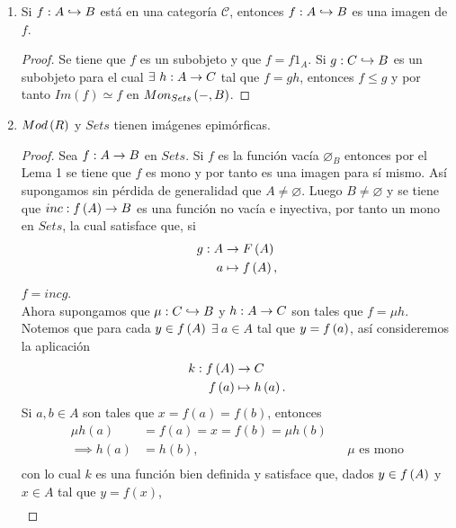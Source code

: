 \documentclass{article}
\begin{document}
\begin{enumerate}[label=\textbf{Ej \arabic*.}]
\begin{proof}
			En el caso en que $I = \emptyset$, $\eta:K\to A$ el ecualizador de $(\alpha,\beta)$ cumple que $\forall i \in I\quad \mu_i\leq \eta$ (por 
			vacuidad), entonces por la observación 1.3.4(2) $\mu\leq \eta$, es decir, existe $\gamma:\displaystyle\bigcup_{i\in I}A_i\longrightarrow K$ tal que 
			$\mu=\eta \gamma$ así 
			\[\alpha\mu=\alpha\eta\gamma=\beta \eta\gamma=\beta\mu.\]
		\end{proof}
		\item Si $\catarrow{f}{A}{B}{m}$ está en una categoría $\mathscr{C}$, entonces $\catarrow{f}{A}{B}{m}$ es una imagen de $f$.
		\begin{proof}
			Se tiene que $f$ es un subobjeto y que $f=f1_A$. Si $\catarrow{g}{C}{B}{m}$ es un subobjeto para el cual $\exists\ \catarrow{h}{A}{C}{}$ tal que $f=gh$, entonces $f\leq g$ y por tanto $Im(f)\simeq f$ en $Mon_{Sets}\left(-,B\right)$.
		\end{proof}
		\item $Mod\left(R\right)$ y $Sets$ tienen imágenes epimórficas.
		\begin{proof}
			Sea $\catarrow{f}{A}{B}{}$ en $Sets$. Si $f$ es la función vacía $\varnothing_B$ entonces por el Lema 1 se tiene que $f$ es mono y por tanto es una imagen para sí mismo. Así supongamos sin pérdida de generalidad que $A\neq\varnothing$. Luego $B\neq\varnothing$ y se tiene que $\catarrow{inc}{f\lrprth{A}}{B}{}$ es una función no vacía e inyectiva, por tanto un mono en $Sets$, la cual satisface que, si 
			\begin{align*}
				g: A &\rightarrow F\left(A\right)\\ a &\mapsto f\left(A\right),
			\end{align*}
			$f=inc g$.\\
			Ahora supongamos que $\catarrow{\mu}{C}{B}{m}$ y $\catarrow{h}{A}{C}{}$ son tales que $f=\mu h$. Notemos que para cada $y\in f\left(A\right)$ $\exists\ a\in A$ tal que $y=f\left(a\right)$, así consideremos la aplicación
			\begin{align*}
				k: f\left(A\right) &\rightarrow C\\ f\left(a\right) &\mapsto h\left(a\right).
			\end{align*}
			Si $a,b\in A$ son tales que $x=f(a)=f(b)$, entonces
			\begin{align*}
				\mu h(a)&=f(a)=x=f(b)=\mu h(b)\\
				\implies h(a)&=h(b), && \mu \text{ es mono}\\
			\end{align*}
			con lo cual $k$ es una función bien definida y satisface que, dados $y\in f\left(A\right)$ y $x\in A$ tal que $y=f(x)$,
			\begin{align*}

\end{align*}
\end{proof}
\end{enumerate}
\end{document}
